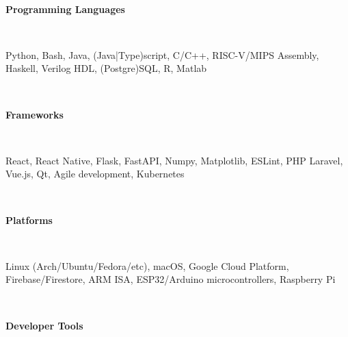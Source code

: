 \documentclass[letterpaper,10pt]{article}
\begin{document}
\begin{multicols*}{2}
  \vspace{.5em} \\
  \begin{large} \textbf{Programming Languages} \end{large} 
  \vspace{3px} \\ \indent
  \begin{minipage}{.45\textwidth}
    \begin{flushleft}
      Python, Bash, Java, (Java|Type)script, C/C++, RISC-V/MIPS Assembly, Haskell, Verilog HDL, (Postgre)SQL, R, Matlab
    \end{flushleft}
  \end{minipage}
  \vspace{.5em} \\
  \begin{large} \textbf{Frameworks} \end{large} 
  \vspace{3px} \\ \indent
  \begin{minipage}{.45\textwidth}
    \begin{flushleft}
      React, React Native, Flask, FastAPI, Numpy, Matplotlib, ESLint, PHP Laravel, Vue.js, Qt, Agile development, Kubernetes
    \end{flushleft}
  \end{minipage}
  \vspace{.5em} \\
  \begin{large} \textbf{Platforms} \end{large}
  \vspace{3px} \\ \indent
  \begin{minipage}{.45\textwidth}
    \begin{flushleft}
      Linux (Arch/Ubuntu/Fedora/etc), macOS, Google Cloud Platform, Firebase/Firestore, ARM ISA, ESP32/Arduino microcontrollers, Raspberry Pi
    \end{flushleft}
  \end{minipage}
  \vspace{.5em} \\
  \begin{large} \textbf{Developer Tools} \end{large} 
  \vspace{3px} \\ \indent
  \begin{minipage}{.45\textwidth}

\end{minipage}
\end{multicols*}
\end{document}
